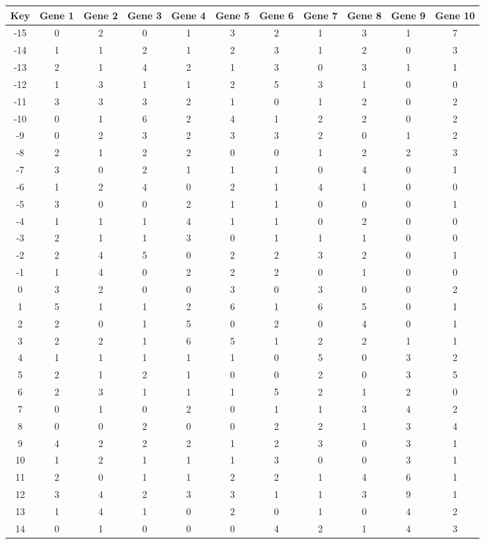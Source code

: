 \begin{tabular}{|c|c|c|c|c|c|c|c|c|c|c|}
\hline
Key & Gene 1 & Gene 2 & Gene 3 & Gene 4 & Gene 5 & Gene 6 & Gene 7 & Gene 8 & Gene 9 & Gene 10 \\
\hline
-15 & 0 & 2 & 0 & 1 & 3 & 2 & 1 & 3 & 1 & 7 \\
-14 & 1 & 1 & 2 & 1 & 2 & 3 & 1 & 2 & 0 & 3 \\
-13 & 2 & 1 & 4 & 2 & 1 & 3 & 0 & 3 & 1 & 1 \\
-12 & 1 & 3 & 1 & 1 & 2 & 5 & 3 & 1 & 0 & 0 \\
-11 & 3 & 3 & 3 & 2 & 1 & 0 & 1 & 2 & 0 & 2 \\
-10 & 0 & 1 & 6 & 2 & 4 & 1 & 2 & 2 & 0 & 2 \\
-9 & 0 & 2 & 3 & 2 & 3 & 3 & 2 & 0 & 1 & 2 \\
-8 & 2 & 1 & 2 & 2 & 0 & 0 & 1 & 2 & 2 & 3 \\
-7 & 3 & 0 & 2 & 1 & 1 & 1 & 0 & 4 & 0 & 1 \\
-6 & 1 & 2 & 4 & 0 & 2 & 1 & 4 & 1 & 0 & 0 \\
-5 & 3 & 0 & 0 & 2 & 1 & 1 & 0 & 0 & 0 & 1 \\
-4 & 1 & 1 & 1 & 4 & 1 & 1 & 0 & 2 & 0 & 0 \\
-3 & 2 & 1 & 1 & 3 & 0 & 1 & 1 & 1 & 0 & 0 \\
-2 & 2 & 4 & 5 & 0 & 2 & 2 & 3 & 2 & 0 & 1 \\
-1 & 1 & 4 & 0 & 2 & 2 & 2 & 0 & 1 & 0 & 0 \\
0 & 3 & 2 & 0 & 0 & 3 & 0 & 3 & 0 & 0 & 2 \\
1 & 5 & 1 & 1 & 2 & 6 & 1 & 6 & 5 & 0 & 1 \\
2 & 2 & 0 & 1 & 5 & 0 & 2 & 0 & 4 & 0 & 1 \\
3 & 2 & 2 & 1 & 6 & 5 & 1 & 2 & 2 & 1 & 1 \\
4 & 1 & 1 & 1 & 1 & 1 & 0 & 5 & 0 & 3 & 2 \\
5 & 2 & 1 & 2 & 1 & 0 & 0 & 2 & 0 & 3 & 5 \\
6 & 2 & 3 & 1 & 1 & 1 & 5 & 2 & 1 & 2 & 0 \\
7 & 0 & 1 & 0 & 2 & 0 & 1 & 1 & 3 & 4 & 2 \\
8 & 0 & 0 & 2 & 0 & 0 & 2 & 2 & 1 & 3 & 4 \\
9 & 4 & 2 & 2 & 2 & 1 & 2 & 3 & 0 & 3 & 1 \\
10 & 1 & 2 & 1 & 1 & 1 & 3 & 0 & 0 & 3 & 1 \\
11 & 2 & 0 & 1 & 1 & 2 & 2 & 1 & 4 & 6 & 1 \\
12 & 3 & 4 & 2 & 3 & 3 & 1 & 1 & 3 & 9 & 1 \\
13 & 1 & 4 & 1 & 0 & 2 & 0 & 1 & 0 & 4 & 2 \\
14 & 0 & 1 & 0 & 0 & 0 & 4 & 2 & 1 & 4 & 3 \\
\hline
\end{tabular}